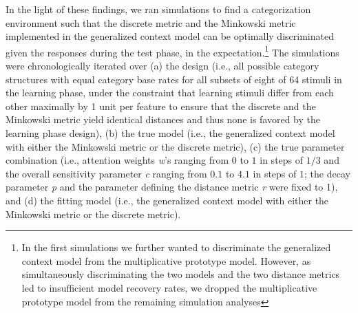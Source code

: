 \documentclass[a4paper,man,natbib]{apa6}
\begin{document}
In the light of these findings, we ran simulations to find a categorization environment such that the discrete metric and the Minkowski metric implemented in the generalized context model can be optimally discriminated given the responses during the test phase, in the expectation.\footnote{In the first simulations we further wanted to discriminate the generalized context model from the multiplicative prototype model. However, as simultaneously discriminating the two models and the two distance metrics led to insufficient model recovery rates, we dropped the multiplicative prototype model from the remaining simulation analyses} The simulations were chronologically iterated over (a) the design (i.e., all possible category structures with equal category base rates for all subsets of eight of 64 stimuli in the learning phase, under the constraint that learning stimuli differ from each other maximally by 1 unit per feature to ensure that the discrete and the Minkowski metric yield identical distances and thus none is favored by the learning phase design), (b) the true model (i.e., the generalized context model with either the Minkowski metric or the discrete metric), (c) the true parameter combination (i.e., attention weights \textit{w}'s ranging from $0$ to $1$ in steps of $1/3$ and the overall sensitivity parameter \textit{c} ranging from $0.1$ to $4.1$ in steps of $1$; the decay parameter \textit{p} and the parameter defining the distance metric \textit{r} were fixed to 1), and (d) the fitting model (i.e., the generalized context model with either the Minkowski metric or the discrete metric).

\end{document}

